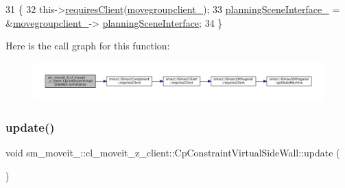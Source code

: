 \begin{DoxyCode}
31         \{
32             this->\hyperlink{classsmacc_1_1ISmaccComponent_a36c085d906fbae0fcaee817aaeafebf4}{requiresClient}(\hyperlink{classsm__moveit__4_1_1cl__moveit__z__client_1_1CpConstraintVirtualSideWall_a0232826a9835e4d0642f295daab435c5}{movegroupclient\_});
33             \hyperlink{classsm__moveit__4_1_1cl__moveit__z__client_1_1CpConstraintVirtualSideWall_a50a72a86820c23dde2c433c8500f10bd}{planningSceneInterface\_} = &\hyperlink{classsm__moveit__4_1_1cl__moveit__z__client_1_1CpConstraintVirtualSideWall_a0232826a9835e4d0642f295daab435c5}{movegroupclient\_}->
      \hyperlink{classmoveit__z__client_1_1ClMoveGroup_a21c879b2683286aa21ce68f40195b4b5}{planningSceneInterface};
34         \}
\end{DoxyCode}
Here is the call graph for this function\+:
\nopagebreak
\begin{figure}[H]
\begin{center}
\leavevmode
\includegraphics[width=350pt]{classsm__moveit__4_1_1cl__moveit__z__client_1_1CpConstraintVirtualSideWall_a790ff97860037f8587d1ef92752219b0_cgraph}
\end{center}
\end{figure}
\mbox{\label{classsm__moveit__4_1_1cl__moveit__z__client_1_1CpConstraintVirtualSideWall_af0a5fbcc097cdbda75888b2b2a2e1f9e}} 
\subsubsection{\texorpdfstring{update()}{update()}}
{\footnotesize\ttfamily void sm\+\_\+moveit\+\_\+::cl\+\_\+moveit\+\_\+z\+\_\+client\+::\+Cp\+Constraint\+Virtual\+Side\+Wall\+::update (\begin{DoxyParamCaption}{ }\end{DoxyParamCaption})\hspace{0.3cm}{\ttfamily [virtual]}}



